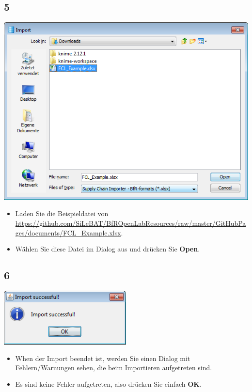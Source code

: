 \documentclass{beamer}
\begin{document}
\subsection{5}
\begin{frame}
	\begin{center}
  		\includegraphics[height=0.6\textheight]{5.png}
	\end{center}
	\begin{itemize}
		\item Laden Sie die Beispieldatei von \url{https://github.com/SiLeBAT/BfROpenLabResources/raw/master/GitHubPages/documents/FCL_Example.xlsx}.
		\item Wählen Sie diese Datei im Dialog aus und drücken Sie \textbf{Open}.
	\end{itemize}
\end{frame}

\subsection{6}
\begin{frame}
	\begin{center}
  		\includegraphics[width=0.5\textwidth]{6.png}
	\end{center}
	\begin{itemize}
		\item When der Import beendet ist, werden Sie einen Dialog mit Fehlern/Warnungen sehen, die beim Importieren aufgetreten sind.
		\item Es sind keine Fehler aufgetreten, also drücken Sie einfach \textbf{OK}.
	\end{itemize}
\end{frame}
\end{document}

